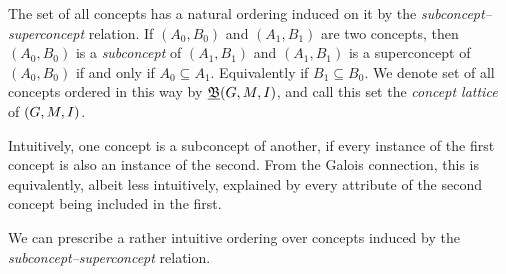 The set of all concepts has a natural ordering induced on it by the \textit{subconcept--superconcept} relation. If $(A_0,B_0)$ and $(A_1,B_1)$ are two concepts, then $(A_0,B_0)$ is a \textit{subconcept} of $(A_1, B_1)$ and $(A_1, B_1)$ is a superconcept of $(A_0,B_0)$ if and only if $A_0 \subseteq A_1$. Equivalently if $B_1 \subseteq B_0$. We denote set of all concepts ordered in this way by $\underline{{\mathfrak B}} (G,M,\mathrel{I})$, and call this set the \textit{concept lattice} of $(G,M,\mathrel{I})$.

Intuitively, one concept is a subconcept of another, if every instance of the first concept is also an instance of the second. From the Galois connection, this is equivalently, albeit less intuitively, explained by every attribute of the second concept being included in the first.

We can prescribe a rather intuitive ordering over concepts induced by the \textit{subconcept–superconcept} relation. \begin{figure}[H]
  \centering
\end{figure}
